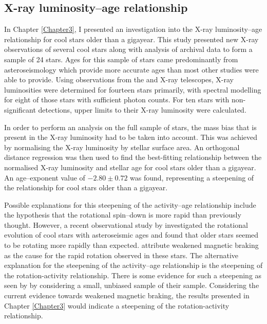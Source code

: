 \subsection{X-ray luminosity--age relationship}

In Chapter \ref{Chapter3}, I presented an investigation into the X-ray luminosity--age relationship for cool stars older than a gigayear. This study presented new X-ray observations of several cool stars along with analysis of archival data to form a sample of 24 stars. Ages for this sample of stars came predominantly from asteroseismology which provide more accurate ages than most other studies were able to provide. Using observations from the \Chandra and \XMM X-ray telescopes, X-ray luminosities were determined for fourteen stars primarily, with spectral modelling for eight of those stars with sufficient photon counts. For ten stars with non-significant detections, upper limits to their X-ray luminosity were calculated.

In order to perform an analysis on the full sample of stars, the mass bias that is present in the X-ray luminosity had to be taken into account. This was achieved by normalising the X-ray luminosity by stellar surface area. An orthogonal distance regression was then used to find the best-fitting relationship between the normalised X-ray luminosity and stellar age for cool stars older than a gigayear. An age--exponent value of $-2.80 \pm 0.72$ was found, representing a steepening of the relationship for cool stars older than a gigayear.

Possible explanations for this steepening of the activity--age relationship include the hypothesis that the rotational spin--down is more rapid than previously thought. However, a recent observational study by \citealt{van_Saders_etal_2016} investigated the rotational evolution of cool stars with asteroseismic ages and found that older stars seemed to be rotating more rapidly than expected. \citet{van_Saders_etal_2016} attribute weakened magnetic braking as the cause for the rapid rotation observed in these stars. The alternative explanation for the steepening of the activity--age relationship is the steepening of the rotation-activity relationship. There is some evidence for such a steepening as seen by \citet{Wright_etal_2011} by considering a small, unbiased sample of their sample. Considering the current evidence towards weakened magnetic braking, the results presented in Chapter \ref{Chapter3} would indicate a steepening of the rotation-activity relationship.

